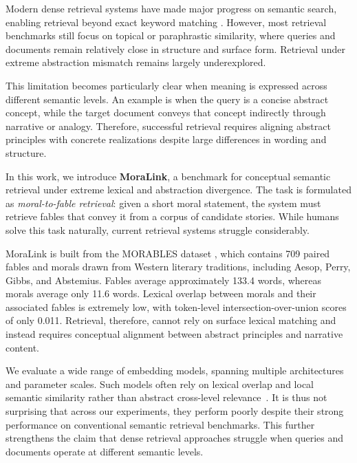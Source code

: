 \documentclass[11pt]{article}
\begin{document}
Modern dense retrieval systems have made major progress on semantic search, enabling retrieval beyond exact keyword matching \citep{reimers-gurevych-2019-sentence, muennighoff-etal-2023-mteb, thakur2021beirheterogenousbenchmarkzeroshot}. 
However, most retrieval benchmarks still focus on topical or paraphrastic similarity, where queries and documents remain relatively close in structure and surface form. Retrieval under extreme abstraction mismatch remains largely underexplored.

This limitation becomes particularly clear when meaning is expressed across different semantic levels.
An example is when the query is a concise abstract concept, while the target document conveys that concept indirectly through narrative or analogy.
Therefore, successful retrieval requires aligning abstract principles with concrete realizations despite large differences in wording and structure.

In this work, we introduce \textbf{MoraLink}, a benchmark for conceptual semantic retrieval under extreme lexical and abstraction divergence. 
The task is formulated as \emph{moral-to-fable retrieval}: given a short moral statement, the system must retrieve fables that convey it from a corpus of candidate stories. 
While humans solve this task naturally, current retrieval systems struggle considerably.

MoraLink is built from the MORABLES dataset \citep{marcuzzo-etal-2025-morables}, which contains 709 paired fables and morals drawn from Western literary traditions, including Aesop, Perry, Gibbs, and Abstemius.
Fables average approximately 133.4 words, whereas morals average only 11.6 words.
Lexical overlap between morals and their associated fables is extremely low, with token-level intersection-over-union scores of only 0.011.
Retrieval, therefore, cannot rely on surface lexical matching and instead requires conceptual alignment between abstract principles and narrative content.

We evaluate a wide range of embedding models, spanning multiple architectures and parameter scales.
Such models often rely on lexical overlap and local semantic similarity rather than abstract cross-level relevance~\citep{wang2022sncsecontrastivelearningunsupervised,Miao_2023,shi-etal-2023-osscse}.
It is thus not surprising that across our experiments, they perform poorly despite their strong performance on conventional semantic retrieval benchmarks. 
This further strengthens the claim that dense retrieval approaches struggle when queries and documents operate at different semantic levels.
\end{document}

